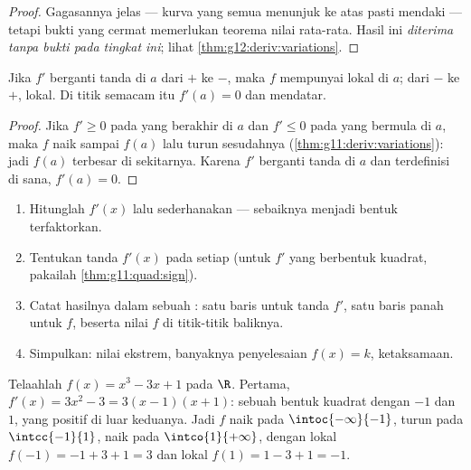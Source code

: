 \begin{proof}
Gagasannya jelas --- kurva yang semua  menunjuk ke atas pasti
mendaki --- tetapi bukti yang cermat memerlukan teorema nilai rata-rata. Hasil
ini \emph{diterima tanpa bukti pada tingkat ini}; lihat \cref{thm:g12:deriv:variations}.
\end{proof}

\begin{proposition}\label{prop:g11:deriv:extrema}
Jika $f'$ berganti tanda di $a$ dari $+$ ke $-$, maka $f$ mempunyai 
lokal di $a$; dari $-$ ke $+$,  lokal. Di titik semacam itu $f'(a) = 0$
dan  mendatar.
\end{proposition}

\begin{proof}
Jika $f' \geq 0$ pada  yang berakhir di $a$ dan $f' \leq 0$ pada
 yang bermula di $a$, maka $f$ naik sampai $f(a)$ lalu turun sesudahnya
(\cref{thm:g11:deriv:variations}): jadi $f(a)$ terbesar di sekitarnya. Karena
$f'$ berganti tanda di $a$ dan terdefinisi di sana, $f'(a) = 0$.
\end{proof}

\begin{method}\label{met:g11:deriv:study}
\begin{enumerate}
  \item Hitunglah $f'(x)$ lalu sederhanakan --- sebaiknya menjadi bentuk terfaktorkan.
  \item Tentukan tanda $f'(x)$ pada setiap  (untuk $f'$ yang
        berbentuk kuadrat, pakailah \cref{thm:g11:quad:sign}).
  \item Catat hasilnya dalam sebuah \emph{}: satu baris untuk
        tanda $f'$, satu baris panah untuk $f$, beserta nilai $f$ di
        titik-titik baliknya.
  \item Simpulkan: nilai ekstrem, banyaknya penyelesaian $f(x) = k$, ketaksamaan.
\end{enumerate}
\end{method}

\begin{example}\label{ex:g11:deriv:study}
Telaahlah $f(x) = x^3 - 3x + 1$ pada $\R$. Pertama,
$f'(x) = 3x^2 - 3 = 3(x-1)(x+1)$: sebuah bentuk kuadrat dengan  $-1$ dan
$1$, yang positif di luar keduanya. Jadi $f$ naik pada $\intoc{-\infty}{-1}$,
turun pada $\intcc{-1}{1}$, naik pada $\intco{1}{+\infty}$, dengan
 lokal $f(-1) = -1 + 3 + 1 = 3$ dan  lokal
$f(1) = 1 - 3 + 1 = -1$.
\end{example}

